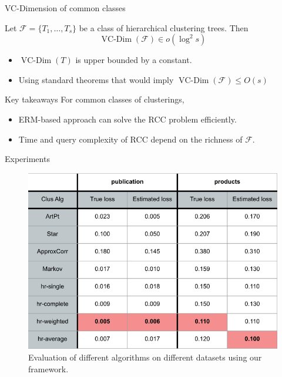 \documentclass{beamer}
\newcommand{\mc}{\mathcal}
\DeclareMathOperator*{\vcdim}{VC-Dim}
\begin{document}
\begin{frame}{VC-Dimension of common classes}
	\begin{block}{}
		Let $\mc F = \{T_1, \ldots, T_s\}$ be a class of hierarchical clustering trees. Then 
		$$\vcdim({\mc F}) \in o(\log^2 s) $$
	\end{block}
	
	\begin{itemize}
		\vspace{20pt}\item $\vcdim(T)$ is upper bounded by a constant.
		\vspace{10pt}\item Using standard theorems that would imply $\vcdim(\mc F) \le O(s)$
	\end{itemize}
\end{frame}

\begin{frame}{Key takeaways}
	For common classes of clusterings, 
	\begin{itemize}
		\vspace{20pt}\item ERM-based approach can solve the RCC problem efficiently. 
		\vspace{15pt}\item Time and query complexity of RCC depend on the richness of $\mc F$.
	\end{itemize}
\end{frame}

\begin{frame}{Experiments}
	\begin{figure}
	\includegraphics[trim=0 0 0 0,scale=0.35]{figures/deDuplication/experiments.png}
	\caption{Evaluation of different algorithms on different datasets using our framework.}
	\end{figure}
\end{frame}
\end{document}
